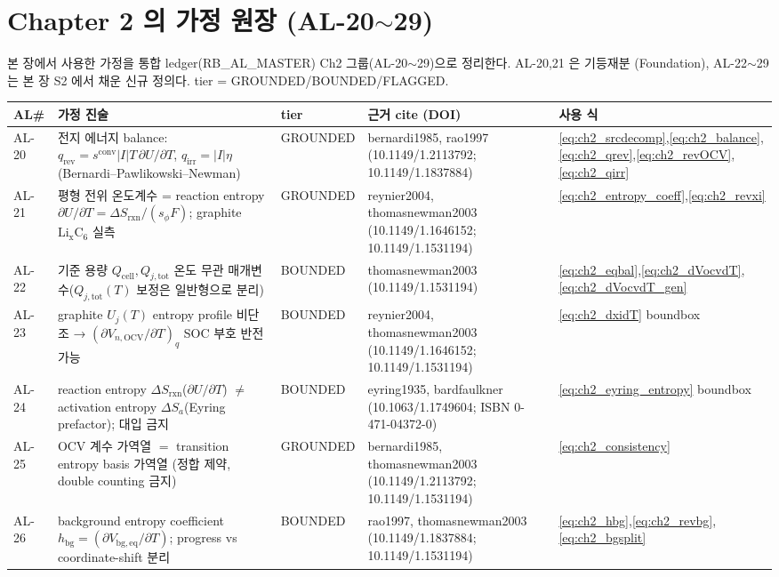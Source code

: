 \documentclass[11pt,a4paper]{article}
\newcommand{\eq}{\mathrm{eq}}
\newcommand{\bg}{\mathrm{bg}}
\newcommand{\cell}{\mathrm{cell}}
\newcommand{\OCV}{\mathrm{OCV}}
\newcommand{\tot}{\mathrm{tot}}
\newcommand{\irr}{\mathrm{irr}}
\newcommand{\rev}{\mathrm{rev}}
\newcommand{\rxn}{\mathrm{rxn}}
\newcommand{\conv}{\mathrm{conv}}
\begin{document}
\section{Chapter 2 의 가정 원장 (AL-20$\sim$29)}\label{sec:ch2_al}
본 장에서 사용한 가정을 통합 ledger(RB\_AL\_MASTER) Ch2 그룹(AL-20$\sim$29)으로 정리한다. AL-20,21 은 기등재분
(Foundation), AL-22$\sim$29 는 본 장 S2 에서 채운 신규 정의다. tier = GROUNDED/BOUNDED/FLAGGED.
{\small
\begin{longtable}{p{} p{} p{} p{} p{}}
\toprule AL\# & 가정 진술 & tier & 근거 cite (DOI) & 사용 식 \\ \midrule \endhead
AL-20 & 전지 에너지 balance: $q_\rev=s^\conv|I|T\,\partial U/\partial T$, $q_\irr=|I|\eta$ (Bernardi--Pawlikowski--Newman) & GROUNDED & bernardi1985, rao1997 (10.1149/1.2113792; 10.1149/1.1837884) & \eqref{eq:ch2_srcdecomp},\eqref{eq:ch2_balance},\eqref{eq:ch2_qrev},\eqref{eq:ch2_revOCV},\eqref{eq:ch2_qirr} \\
AL-21 & 평형 전위 온도계수 = reaction entropy $\partial U/\partial T=\Delta S_\rxn/(s_\phi F)$; graphite $\mathrm{Li_xC_6}$ 실측 & GROUNDED & reynier2004, thomasnewman2003 (10.1149/1.1646152; 10.1149/1.1531194) & \eqref{eq:ch2_entropy_coeff},\eqref{eq:ch2_revxi} \\
AL-22 & 기준 용량 $Q_\cell,Q_{j,\tot}$ 온도 무관 매개변수($Q_{j,\tot}(T)$ 보정은 일반형으로 분리) & BOUNDED & thomasnewman2003 (10.1149/1.1531194) & \eqref{eq:ch2_eqbal},\eqref{eq:ch2_dVocvdT},\eqref{eq:ch2_dVocvdT_gen} \\
AL-23 & graphite $U_j(T)$ entropy profile 비단조 → $(\partial V_{n,\OCV}/\partial T)_q$ SOC 부호 반전 가능 & BOUNDED & reynier2004, thomasnewman2003 (10.1149/1.1646152; 10.1149/1.1531194) & \eqref{eq:ch2_dxidT} boundbox \\
AL-24 & reaction entropy $\Delta S_\rxn$($\partial U/\partial T$) $\ne$ activation entropy $\Delta S_a$(Eyring prefactor); 대입 금지 & BOUNDED & eyring1935, bardfaulkner (10.1063/1.1749604; ISBN 0-471-04372-0) & \eqref{eq:ch2_eyring_entropy} boundbox \\
AL-25 & OCV 계수 가역열 $=$ transition entropy basis 가역열 (정합 제약, double counting 금지) & GROUNDED & bernardi1985, thomasnewman2003 (10.1149/1.2113792; 10.1149/1.1531194) & \eqref{eq:ch2_consistency} \\
AL-26 & background entropy coefficient $h_\bg=(\partial V_{\bg,\eq}/\partial T)$; progress vs coordinate-shift 분리 & BOUNDED & rao1997, thomasnewman2003 (10.1149/1.1837884; 10.1149/1.1531194) & \eqref{eq:ch2_hbg},\eqref{eq:ch2_revbg},\eqref{eq:ch2_bgsplit} \\

\end{longtable}}
\end{document}
